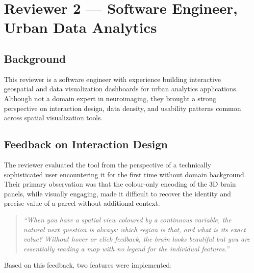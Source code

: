 \documentclass[11pt,letterpaper]{article}
\begin{document}
\section{Reviewer 2 — Software Engineer, Urban Data Analytics}

\subsection*{Background}

This reviewer is a software engineer with experience building interactive
geospatial and data visualization dashboards for urban analytics applications.
Although not a domain expert in neuroimaging, they brought a strong perspective
on interaction design, data density, and usability patterns common across
spatial visualization tools.

\subsection*{Feedback on Interaction Design}

The reviewer evaluated the tool from the perspective of a technically
sophisticated user encountering it for the first time without domain
background.
Their primary observation was that the colour-only encoding of the 3D brain
panels, while visually engaging, made it difficult to recover the identity and
precise value of a parcel without additional context.

\begin{quote}
\itshape
``When you have a spatial view coloured by a continuous variable, the natural
next question is always: which region is that, and what is its exact value?
Without hover or click feedback, the brain looks beautiful but you are
essentially reading a map with no legend for the individual features.''
\end{quote}

Based on this feedback, two features were implemented:
\end{document}
